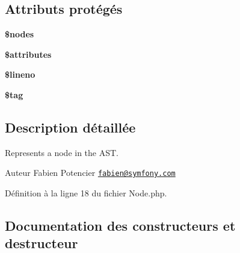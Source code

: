 \subsection*{Attributs protégés}
\begin{DoxyCompactItemize}
\item 
{\bfseries \$nodes}\hypertarget{class_twig___node_afc84f46342a660cca8589570197bc421}{}\label{class_twig___node_afc84f46342a660cca8589570197bc421}

\item 
{\bfseries \$attributes}\hypertarget{class_twig___node_adc851f7a62250e75df0490c0280aef4c}{}\label{class_twig___node_adc851f7a62250e75df0490c0280aef4c}

\item 
{\bfseries \$lineno}\hypertarget{class_twig___node_a865384ce49abf1c78f8aea48c7b5aa48}{}\label{class_twig___node_a865384ce49abf1c78f8aea48c7b5aa48}

\item 
{\bfseries \$tag}\hypertarget{class_twig___node_a81d5015d41ed8ec66e9db8cdc5db9555}{}\label{class_twig___node_a81d5015d41ed8ec66e9db8cdc5db9555}

\end{DoxyCompactItemize}


\subsection{Description détaillée}
Represents a node in the A\+ST.

\begin{DoxyAuthor}{Auteur}
Fabien Potencier \href{mailto:fabien@symfony.com}{\tt fabien@symfony.\+com} 
\end{DoxyAuthor}


Définition à la ligne 18 du fichier Node.\+php.



\subsection{Documentation des constructeurs et destructeur}
